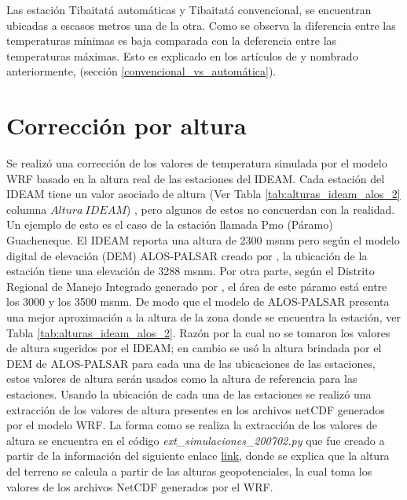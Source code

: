 Las estación Tibaitatá automáticas y Tibaitatá convencional, se encuentran ubicadas a escasos metros una de la otra. Como se observa la diferencia entre las temperaturas mínimas es baja comparada con la deferencia entre las temperaturas máximas. Esto es explicado en los artículos de \citet{lacombe2010results, kaspar2016climate} y nombrado anteriormente, (sección \ref{convencional_vs_automática}).

\section{Corrección por altura}

Se realizó una corrección de los valores de temperatura simulada por el modelo WRF basado en la altura real de las estaciones del IDEAM. Cada estación del IDEAM tiene un valor asociado de altura (Ver Tabla \ref{tab:alturas_ideam_alos_2} columna $ Altura\ IDEAM$) , pero algunos de estos no concuerdan con la realidad. Un ejemplo de esto es el caso de la estación llamada Pmo (Páramo) Guacheneque. El IDEAM reporta una altura de 2300 msnm pero según el modelo digital de elevación (DEM) ALOS-PALSAR creado por \citet{ASFDAAC2007}, la ubicación de la estación tiene una elevación de 3288 msnm. Por otra parte, según el Distrito Regional de Manejo Integrado generado por \citet{Corpochivor2011}, el área de este páramo está entre los 3000 y los 3500 msnm. De modo que el modelo de ALOS-PALSAR presenta una mejor aproximación a la altura de la zona donde se encuentra la estación, ver Tabla \ref{tab:alturas_ideam_alos_2}. Razón por la cual no se tomaron los valores de altura sugeridos por el IDEAM; en cambio se usó la altura brindada por el DEM de ALOS-PALSAR para cada una de las ubicaciones de las estaciones, estos valores de altura serán usados como la altura de referencia para las estaciones. Usando la ubicación de cada una de las estaciones se realizó una extracción de los valores de altura presentes en los archivos netCDF generados por el modelo WRF. La forma como se realiza la extracción de los valores de altura se encuentra en el código \textit{ext\_simulaciones\_200702.py} que fue creado a partir de la información del siguiente enlace \textcolor{blue}{\href{http://www.openwfm.org/wiki/How_to_interpret_WRF_variables}{link}}, donde se explica que la altura del terreno se calcula a partir de las alturas geopotenciales, la cual toma los valores de los archivos NetCDF generados por el WRF.\\


